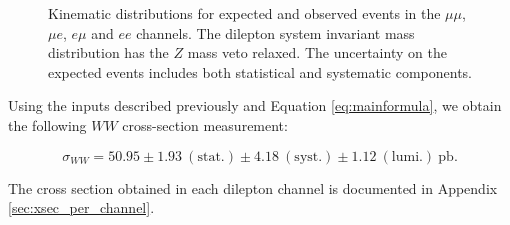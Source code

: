 \begin{figure}[!hbtp]
\begin{center}
\caption{Kinematic distributions for expected and observed events in the  $\mu\mu$, $\mu{e}$, $e\mu$ and $ee$ channels.
The dilepton system invariant mass distribution has the $Z$ mass veto relaxed.
The uncertainty on the expected events includes both statistical and systematic components.}
\label{fig:inclplots}
\end{center}
\end{figure}


Using the inputs described previously and Equation \ref{eq:mainformula},
we obtain the following $WW$ cross-section measurement:

\begin{equation*}
\sigma_{WW}  = 50.95 \pm 1.93~\mathrm{(stat.)} \pm 4.18~\mathrm{(syst.)} \pm 1.12~\mathrm{(lumi.)~pb}.
\end{equation*}

The cross section obtained in each dilepton channel is documented in Appendix \ref{sec:xsec_per_channel}.

